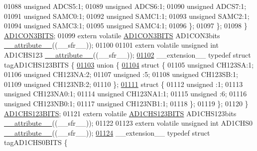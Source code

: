 \begin{DoxyCode}
01088       \textcolor{keywordtype}{unsigned} ADCS5:1;
01089       \textcolor{keywordtype}{unsigned} ADCS6:1;
01090       \textcolor{keywordtype}{unsigned} ADCS7:1;
01091       \textcolor{keywordtype}{unsigned} SAMC0:1;
01092       \textcolor{keywordtype}{unsigned} SAMC1:1;
01093       \textcolor{keywordtype}{unsigned} SAMC2:1;
01094       \textcolor{keywordtype}{unsigned} SAMC3:1;
01095       \textcolor{keywordtype}{unsigned} SAMC4:1;
01096     \};
01097   \};
01098 \} \hyperlink{a00014_db/dab/a00089}{AD1CON3BITS};
01099 \textcolor{keyword}{extern} \textcolor{keyword}{volatile} \hyperlink{a00014_db/dab/a00089}{AD1CON3BITS} AD1CON3bits \hyperlink{a00015_a493c46f03454991ccc5aa7a6e1dfb2a7}{\_\_attribute\_\_}((\_\_sfr\_\_));
01100 
01101 \textcolor{keyword}{extern} \textcolor{keyword}{volatile} \textcolor{keywordtype}{unsigned} \textcolor{keywordtype}{int}  AD1CHS123 \hyperlink{a00015_a493c46f03454991ccc5aa7a6e1dfb2a7}{\_\_attribute\_\_}((\_\_sfr\_\_));
\hypertarget{a00015_source_l01102}{}\hyperlink{a00014}{01102} \_\_extension\_\_ \textcolor{keyword}{typedef} \textcolor{keyword}{struct }tagAD1CHS123BITS \{
\hypertarget{a00015_source_l01103}{}\hyperlink{a00015}{01103}   \textcolor{keyword}{union }\{
\hypertarget{a00015_source_l01104}{}\hyperlink{a00015}{01104}     \textcolor{keyword}{struct }\{
01105       \textcolor{keywordtype}{unsigned} CH123SA:1;
01106       \textcolor{keywordtype}{unsigned} CH123NA:2;
01107       \textcolor{keywordtype}{unsigned} :5;
01108       \textcolor{keywordtype}{unsigned} CH123SB:1;
01109       \textcolor{keywordtype}{unsigned} CH123NB:2;
01110     \};
\hypertarget{a00015_source_l01111}{}\hyperlink{a00015}{01111}     \textcolor{keyword}{struct }\{
01112       \textcolor{keywordtype}{unsigned} :1;
01113       \textcolor{keywordtype}{unsigned} CH123NA0:1;
01114       \textcolor{keywordtype}{unsigned} CH123NA1:1;
01115       \textcolor{keywordtype}{unsigned} :6;
01116       \textcolor{keywordtype}{unsigned} CH123NB0:1;
01117       \textcolor{keywordtype}{unsigned} CH123NB1:1;
01118     \};
01119   \};
01120 \} \hyperlink{a00014_da/dec/a00080}{AD1CHS123BITS};
01121 \textcolor{keyword}{extern} \textcolor{keyword}{volatile} \hyperlink{a00014_da/dec/a00080}{AD1CHS123BITS} AD1CHS123bits \hyperlink{a00015_a493c46f03454991ccc5aa7a6e1dfb2a7}{\_\_attribute\_\_}((\_\_sfr\_\_));
01122 
01123 \textcolor{keyword}{extern} \textcolor{keyword}{volatile} \textcolor{keywordtype}{unsigned} \textcolor{keywordtype}{int}  AD1CHS0 \hyperlink{a00015_a493c46f03454991ccc5aa7a6e1dfb2a7}{\_\_attribute\_\_}((\_\_sfr\_\_));
\hypertarget{a00015_source_l01124}{}\hyperlink{a00014}{01124} \_\_extension\_\_ \textcolor{keyword}{typedef} \textcolor{keyword}{struct }tagAD1CHS0BITS \{

\end{DoxyCode}
